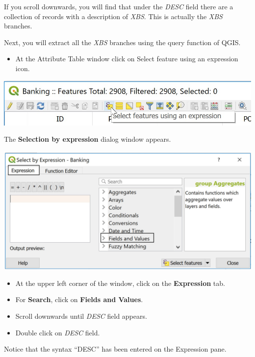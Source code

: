 \documentclass[
  letterpaper,
  DIV=11,
  numbers=noendperiod]{scrreprt}
\providecommand{\tightlist}{%
  \setlength{\itemsep}{0pt}\setlength{\parskip}{0pt}}\usepackage{longtable,booktabs,array}
\begin{document}
If you scroll downwards, you will find that under the \emph{DESC} field
there are a collection of records with a description of \emph{XBS}. This
is actually the \emph{XBS} branches.

Next, you will extract all the \emph{XBS} branches using the query
function of QGIS.

\begin{itemize}
\tightlist
\item
  At the Attribute Table window click on Select feature using an
  expression icon.
\end{itemize}

\includegraphics{./img05/image2.jpg}

The \textbf{Selection by expression} dialog window appears.

\includegraphics{./img05/image3.jpg}

\begin{itemize}
\tightlist
\item
  At the upper left corner of the window, click on the
  \textbf{Expression} tab.
\item
  For \textbf{Search}, click on \textbf{Fields and Values}.
\item
  Scroll downwards until \emph{DESC} field appears.
\item
  Double click on \emph{DESC} field.
\end{itemize}

Notice that the syntax ``DESC'' has been entered on the Expression pane.
\end{document}
